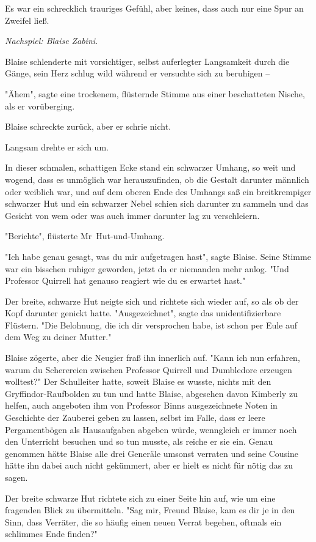 {Es war ein schrecklich trauriges Gefühl, aber keines, dass auch nur eine Spur an Zweifel ließ.

\emph{Nachspiel: Blaise} \emph{Zabini.}

Blaise schlenderte mit vorsichtiger, selbst auferlegter Langsamkeit durch die Gänge, sein Herz schlug wild während er versuchte sich zu beruhigen --

"Ähem", sagte eine trockenem, flüsternde Stimme aus einer beschatteten Nische, als er vorüberging.

Blaise schreckte zurück, aber er schrie nicht.

Langsam drehte er sich um.

In dieser schmalen, schattigen Ecke stand ein schwarzer Umhang, so weit und wogend, dass es unmöglich war herauszufinden, ob die Gestalt darunter männlich oder weiblich war, und auf dem oberen Ende des Umhangs saß ein breitkrempiger schwarzer Hut und ein schwarzer Nebel schien sich darunter zu sammeln und das Gesicht von wem oder was auch immer darunter lag zu verschleiern.

"Berichte", flüsterte Mr~Hut-und-Umhang.

"Ich habe genau gesagt, was du mir aufgetragen hast", sagte Blaise. Seine Stimme war ein bisschen ruhiger geworden, jetzt da er niemanden mehr anlog. "Und Professor Quirrell hat genauso reagiert wie du es erwartet hast."

Der breite, schwarze Hut neigte sich und richtete sich wieder auf, so als ob der Kopf darunter genickt hatte. "Ausgezeichnet", sagte das unidentifizierbare Flüstern. "Die Belohnung, die ich dir versprochen habe, ist schon per Eule auf dem Weg zu deiner Mutter."

Blaise zögerte, aber die Neugier fraß ihn innerlich auf. "Kann ich nun erfahren, warum du Scherereien zwischen Professor Quirrell und Dumbledore erzeugen wolltest?" Der Schulleiter hatte, soweit Blaise es wusste, nichts mit den Gryffindor-Raufbolden zu tun und hatte Blaise, abgesehen davon Kimberly zu helfen, auch angeboten ihm von Professor Binns ausgezeichnete Noten in Geschichte der Zauberei geben zu lassen, selbst im Falle, dass er leere Pergamentbögen als Hausaufgaben abgeben würde, wenngleich er immer noch den Unterricht besuchen und so tun musste, als reiche er sie ein. Genau genommen hätte Blaise alle drei Generäle umsonst verraten und seine Cousine hätte ihn dabei auch nicht gekümmert, aber er hielt es nicht für nötig das zu sagen.

Der breite schwarze Hut richtete sich zu einer Seite hin auf, wie um eine fragenden Blick zu übermitteln. "Sag mir, Freund Blaise, kam es dir je in den Sinn, dass Verräter, die so häufig einen neuen Verrat begehen, oftmals ein schlimmes Ende finden?"

}
